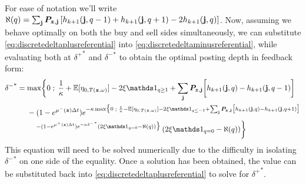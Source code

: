 For ease of notation we'll write $\aleph(q) = \sum_{\mathbf{j}} \bm{P}_{\bm{z},\mathbf{j}} \left[ h_{k+1}(\mathbf{j}, q-1) + h_{k+1}(\mathbf{j}, q+1) -2 h_{k+1}(\mathbf{j}, q)  \right]$. Now, assuming we behave optimally on both the buy and sell sides simultaneously, we can substitute \autoref{eq:discretedeltaplusreferential} into \autoref{eq:discretedeltaminusreferential}, while evaluating both at ${\delta^+}^*$ and ${\delta^-}^*$ to obtain the optimal posting depth in feedback form:
\begin{equation}\label{eq:discretedeltaminusfeedback}
\begin{split}
{\delta^-}^* & = \max \biggl\lbrace 0 \; ; \; \frac{1}{\kappa} + \E[\eta_{0,T(\bz, \omega)}] - 2 \xi \indicator_{q \geq 1} + \sum_\bj \bP_{\bz,\bj} \biggl[ h_{k+1}(\bj, q) - h_{k+1}(\bj, q-1) \biggr] \\
& \hphantom{{}={}} - (1-e^{\mu^-(\bz) \Delta t})e^{-\kappa \max \bigl\lbrace 0 \; ; \; \frac{1}{\kappa} - \E[\eta_{0,T(\bz, \omega)}] - 2 \xi \indicator_{q \leq -1} + \sum_\bj \bP_{\bz,\bj} \bigl[ h_{k+1}(\bj, q) - h_{k+1}(\bj, q+1) \bigr]} \\
& \hphantom{{}={} {}-{}} {}^{-(1-e^{\mu^+ (\bz) \Delta t})e^{-\kappa {\delta^-}^*} \left( 2 \xi \indicator_{q = 0} - \aleph(q) \right) \bigr\rbrace } \left( 2 \xi \indicator_{q = 0} - \aleph(q) \right) \biggr\rbrace
\end{split}
\end{equation}
This equation will need to be solved numerically due to the difficulty in isolating ${\delta^{-}}^*$ on one side of the equality. Once a solution has been obtained, the value can be substituted back into \eqref{eq:discretedeltaplusreferential} to solve for ${\delta^{+}}^*$.

